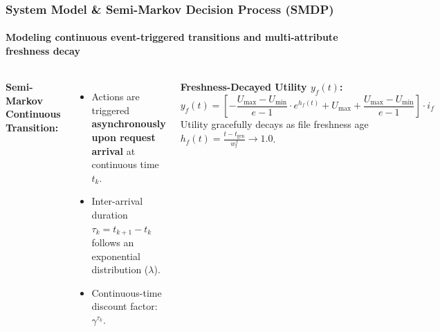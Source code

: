 \documentclass[aspectratio=169, 10pt]{beamer}
\begin{document}
\begin{frame}
    \frametitle{System Model \& Semi-Markov Decision Process (SMDP)}
    \framesubtitle{Modeling continuous event-triggered transitions and multi-attribute freshness decay}

    \begin{columns}[T, onlytextwidth]
        {\color{NavyPrimary}\textbf{Semi-Markov Continuous Transition:}}
        \begin{itemize}
            \small
            \item Actions are triggered \textbf{asynchronously upon request arrival} at continuous time $t_k$.
            \item Inter-arrival duration $\tau_k = t_{k+1} - t_k$ follows an exponential distribution ($\lambda$).
            \item Continuous-time discount factor: $\gamma^{\tau_k}$.
        \end{itemize}

        \vspace{0.2cm}
        {\color{TealAccent}\textbf{Freshness-Decayed Utility $y_f(t)$:}}
        \begin{equation*}
            y_f(t) = \left[ -\frac{U_{\max} - U_{\min}}{e - 1} \cdot e^{h_f(t)} + U_{\max} + \frac{U_{\max} - U_{\min}}{e - 1} \right] \cdot i_f
        \end{equation*}
        \scriptsize Utility gracefully decays as file freshness age $h_f(t) = \frac{t - t_{\text{gen}}}{w_l^f} \to 1.0$.

    \end{columns}
\end{frame}
\end{document}

